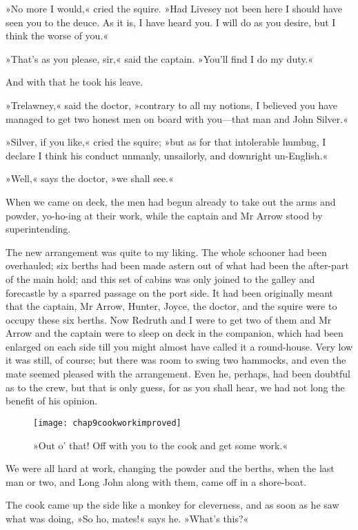 »No more I would,« cried the squire. »Had Livesey not been here I should have seen you to the deuce. As it is, I have heard you. I will do as you desire, but I think the worse of you.«

»That's as you please, sir,« said the captain. »You'll find I do my duty.«

And with that he took his leave.

»Trelawney,« said the doctor, »contrary to all my notions, I believed you have managed to get two honest men on board with you—that man and John Silver.«

»Silver, if you like,« cried the squire; »but as for that intolerable humbug, I declare I think his conduct unmanly, unsailorly, and downright un-English.«

»Well,« says the doctor, »we shall see.«

When we came on deck, the men had begun already to take out the arms and powder, yo-ho-ing at their work, while the captain and Mr Arrow stood by superintending.

The new arrangement was quite to my liking. The whole schooner had been overhauled; six berths had been made astern out of what had been the after-part of the main hold; and this set of cabins was only joined to the galley and forecastle by a sparred passage on the port side. It had been originally meant that the captain, Mr Arrow, Hunter, Joyce, the doctor, and the squire were to occupy these six berths. Now Redruth and I were to get two of them and Mr Arrow and the captain were to sleep on deck in the companion, which had been enlarged on each side till you might almost have called it a round-house. Very low it was still, of course; but there was room to swing two hammocks, and even the mate seemed pleased with the arrangement. Even he, perhaps, had been doubtful as to the crew, but that is only guess, for as you shall hear, we had not long the benefit of his opinion.

\begin{figure}[p]
\centering
\texttt{[image: chap9cookworkimproved]}
\caption[»Off with you to the cook and get some work.«]{»Out o' that! Off with you to the cook and get some work.«}
\end{figure}

We were all hard at work, changing the powder and the berths, when the last man or two, and Long John along with them, came off in a shore-boat.

The cook came up the side like a monkey for cleverness, and as soon as he saw what was doing, »So ho, mates!« says he. »What's this?«

